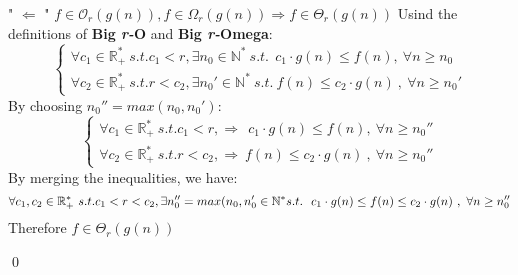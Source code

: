 " $\Leftarrow$ " $ f \in \mathcal{O}_{r}(g(n)), f \in \Omega_{r}(g(n)) \Rightarrow f \in \Theta_{r}(g(n)) $
Usind the definitions of \textbf{Big \textit{r-}O} and \textbf{Big \textit{r-}Omega}: 
  \[\begin{cases} \forall c_{1} \in \mathbb{R}^{*}_{+} \ s.t.  c_{1} < r , \exists n_{0} \in \mathbb{N}^{*}\ s.t.\ \ c_{1} \cdot g(n) \leq f(n) ,\  \forall n \geq n_{0} \\ \forall  c_{2} \in \mathbb{R}^{*}_{+} \ s.t.  r < c_{2} , \exists n_{0}' \in \mathbb{N}^{*}\ s.t.\ f(n) \leq c_{2} \cdot g(n)\ ,\  \forall n \geq n_{0}' \end{cases}\]
By choosing $n_{0}'' = max(n_{0}, n_{0}')$:
  \[\begin{cases} \forall c_{1} \in \mathbb{R}^{*}_{+} \ s.t.  c_{1} < r ,\Rightarrow\ \ c_{1} \cdot g(n) \leq f(n) ,\  \forall n \geq n_{0}'' \\ \forall  c_{2} \in \mathbb{R}^{*}_{+} \ s.t.  r < c_{2} , \Rightarrow \ f(n) \leq c_{2} \cdot g(n)\ ,\  \forall n \geq n_{0}'' \end{cases}\]
By merging the inequalities, we have:
  \[\forall c_{1}, c_{2} \in \mathbb{R}^{*}_{+} \ s.t.  c_{1} < r < c_{2} , \exists n_{0}'' = max(n_{0}, n_{0}' \in \mathbb{N}^{*}\ \\ s.t.\ \ c_{1} \cdot g(n) \leq f(n) \leq c_{2} \cdot g(n)\ ,\  \forall n \geq n_{0}'' \]
Therefore $f \in \Theta_{r}(g(n))$

\qed
 \hfill\break

 
